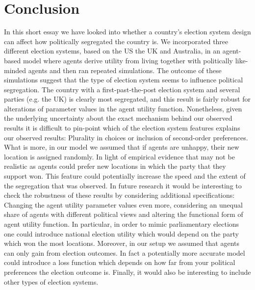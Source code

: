 \documentclass[12pt, a4paper]{article}
\begin{document}
	\section{\label{sec_conc}Conclusion}
	In this short essay we have looked into whether a country's election system design can affect how politically segregated the country is. We incorporated three different election systems, based on the US the UK and Australia, in an agent-based model where agents derive utility from living together with politically like-minded agents and then ran repeated simulations. The outcome of these simulations suggest that the type of election system seems to influence political segregation. The country with a first-past-the-post election system and several parties (e.g. the UK) is clearly most segregated, and this result is fairly robust for alterations of parameter values in the agent utility function. 
	\newline Nonetheless, given the underlying uncertainty about the exact mechanism behind our observed results it is difficult to pin-point which of the election system features explains our observed results: Plurality in choices or inclusion of second-order preferences. What is more, in our model we assumed that if agents are unhappy, their new location is assigned randomly. In light of empirical evidence that may not be realistic as agents could prefer new locations in which the party that they support won. This feature could potentially increase the speed and the extent of the segregation that was observed. 
	\newline In future research it would be interesting to check the robustness of these results by considering additional specifications: Changing the agent utility parameter values even more, considering an unequal share of agents with different political views and altering the functional form of agent utility function. In particular, in order to mimic parliamentary elections one could introduce national election utility which would depend on the party which won the most locations. Moreover, in our setup we assumed that agents can only gain from election outcomes. In fact a potentially more accurate model could introduce a loss function which depends on how far from your political preferences the election outcome is. Finally, it would also be interesting to include other types of election systems. 
	
	
	
\end{document}
